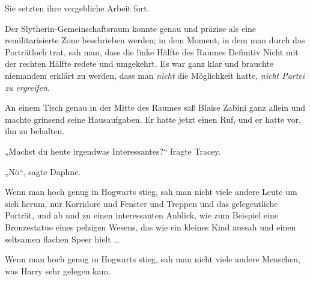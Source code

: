 Sie setzten ihre vergebliche Arbeit fort.


Der Slytherin-Gemeinschaftsraum konnte genau und präzise als eine remilitarisierte Zone beschrieben werden; in dem Moment, in dem man durch das Porträtloch trat, sah man, dass die linke Hälfte des Raumes Definitiv Nicht mit der rechten Hälfte redete und umgekehrt. Es war ganz klar und brauchte niemandem erklärt zu werden, dass man \emph{nicht} die Möglichkeit hatte, \emph{nicht Partei zu ergreifen}.

An einem Tisch genau in der Mitte des Raumes saß Blaise Zabini ganz allein und machte grinsend seine Hausaufgaben. Er hatte jetzt einen Ruf, und er hatte vor, ihn zu behalten.


„Machst du heute irgendwas Interessantes?“ fragte Tracey.

„Nö“, sagte Daphne.


Wenn man hoch genug in Hogwarts stieg, sah man nicht viele andere Leute um sich herum, nur Korridore und Fenster und Treppen und das gelegentliche Porträt, und ab und zu einen interessanten Anblick, wie zum Beispiel eine Bronzestatue eines pelzigen Wesens, das wie ein kleines Kind aussah und einen seltsamen flachen Speer hielt …

Wenn man hoch genug in Hogwarts stieg, sah man nicht viele andere Menschen, was Harry sehr gelegen kam.

